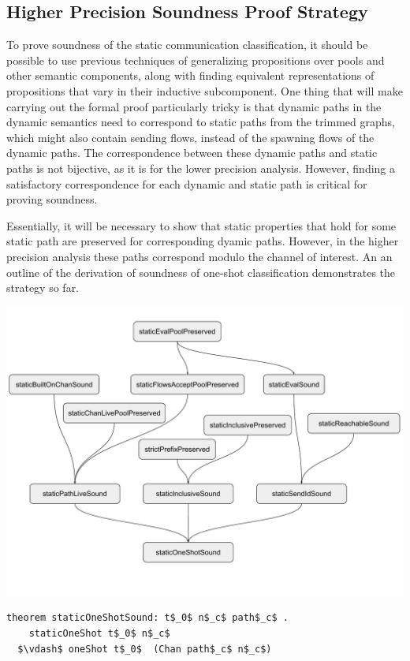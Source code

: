 \documentclass[letterpaper, 11pt]{report}
\begin{document}
\subsection{Higher Precision Soundness Proof Strategy}
To prove soundness of the static communication classification, it should be possible to use
previous techniques of generalizing propositions over pools and other semantic components,
along with finding equivalent representations of propositions that vary in their inductive
subcomponent. One thing that will make carrying out the formal proof particularly tricky is
that dynamic paths in the dynamic semantics need to correspond to static paths from
the trimmed graphs, which might also contain sending flows,
instead of the spawning flows of the dynamic paths.
The correspondence between these dynamic paths and static paths
is not bijective, as it is for the lower precision analysis. However, finding a satisfactory
correspondence for each dynamic and static path is critical for proving soundness.

Essentially, it will be necessary to show that static
properties that hold for some static path are preserved for corresponding dyamic paths. 
However, in the higher precision analysis these paths correspond modulo the channel of interest.
An an outline of the derivation of soundness of one-shot classification demonstrates the strategy so far.

\includegraphics[width=1\textwidth]{cml-proof-high.pdf}

\begin{lstlisting}[language=logic, mathescape]
  theorem staticOneShotSound: t$_0$ n$_c$ path$_c$ . 
    staticOneShot t$_0$ n$_c$
  $\vdash$ oneShot t$_0$  (Chan path$_c$ n$_c$)
\end{lstlisting}
\end{document}
